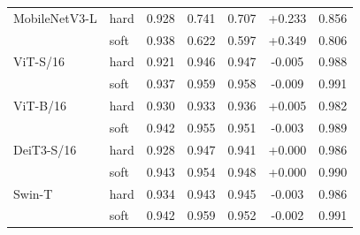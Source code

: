 \begin{table}[!htbp]
{\begin{tabular}{llccccc}
MobileNetV3-L & hard & 0.928 & 0.741 & 0.707 & +0.233 & 0.856 \\
 & soft & 0.938 & 0.622 & 0.597 & +0.349 & 0.806 \\
ViT-S/16 & hard & 0.921 & 0.946 & 0.947 & -0.005 & 0.988 \\
 & soft & 0.937 & 0.959 & 0.958 & -0.009 & 0.991 \\
ViT-B/16 & hard & 0.930 & 0.933 & 0.936 & +0.005 & 0.982 \\
 & soft & 0.942 & 0.955 & 0.951 & -0.003 & 0.989 \\
DeiT3-S/16 & hard & 0.928 & 0.947 & 0.941 & +0.000 & 0.986 \\
 & soft & 0.943 & 0.954 & 0.948 & +0.000 & 0.990 \\
Swin-T & hard & 0.934 & 0.943 & 0.945 & -0.003 & 0.986 \\
 & soft & 0.942 & 0.959 & 0.952 & -0.002 & 0.991 \\
\bottomrule
\end{tabular}}
\end{table}
